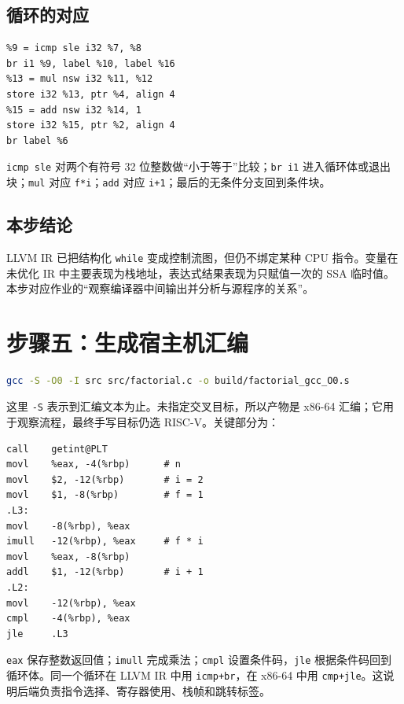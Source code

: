 \documentclass[UTF8,a4paper,12pt]{ctexart}
\begin{document}
\subsection{循环的对应}

\begin{lstlisting}
%9 = icmp sle i32 %7, %8
br i1 %9, label %10, label %16
%13 = mul nsw i32 %11, %12
store i32 %13, ptr %4, align 4
%15 = add nsw i32 %14, 1
store i32 %15, ptr %2, align 4
br label %6
\end{lstlisting}

\texttt{icmp sle} 对两个有符号 32 位整数做“小于等于”比较；\texttt{br i1} 进入循环体或退出块；\texttt{mul} 对应 \texttt{f*i}；\texttt{add} 对应 \texttt{i+1}；最后的无条件分支回到条件块。

\subsection{本步结论}

LLVM IR 已把结构化 \texttt{while} 变成控制流图，但仍不绑定某种 CPU 指令。变量在未优化 IR 中主要表现为栈地址，表达式结果表现为只赋值一次的 SSA 临时值。本步对应作业的“观察编译器中间输出并分析与源程序的关系”。

\section{步骤五：生成宿主机汇编}

\begin{lstlisting}[language=bash]
gcc -S -O0 -I src src/factorial.c -o build/factorial_gcc_O0.s
\end{lstlisting}

这里 \texttt{-S} 表示到汇编文本为止。未指定交叉目标，所以产物是 x86-64 汇编；它用于观察流程，最终手写目标仍选 RISC-V。关键部分为：

\begin{lstlisting}
call    getint@PLT
movl    %eax, -4(%rbp)      # n
movl    $2, -12(%rbp)       # i = 2
movl    $1, -8(%rbp)        # f = 1
.L3:
movl    -8(%rbp), %eax
imull   -12(%rbp), %eax     # f * i
movl    %eax, -8(%rbp)
addl    $1, -12(%rbp)       # i + 1
.L2:
movl    -12(%rbp), %eax
cmpl    -4(%rbp), %eax
jle     .L3
\end{lstlisting}

\texttt{eax} 保存整数返回值；\texttt{imull} 完成乘法；\texttt{cmpl} 设置条件码，\texttt{jle} 根据条件码回到循环体。同一个循环在 LLVM IR 中用 \texttt{icmp+br}，在 x86-64 中用 \texttt{cmp+jle}。这说明后端负责指令选择、寄存器使用、栈帧和跳转标签。
\end{document}
